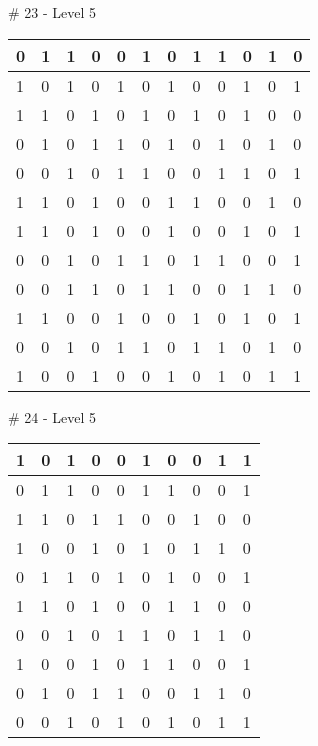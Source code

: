 \smallskip

\# 23 - Level 5 \newline
\begin{tabular}{|m{\collen}|m{\collen}|m{\collen}|m{\collen}|m{\collen}|m{\collen}|m{\collen}|m{\collen}|m{\collen}|m{\collen}|m{\collen}|m{\collen}|}
\hline
  0 & 1 & 1 & 0 & 0 & 1 & 0 & 1 & 1 & 0 & 1 & 0 \\
\hline
  1 & 0 & 1 & 0 & 1 & 0 & 1 & 0 & 0 & 1 & 0 & 1 \\
\hline
  1 & 1 & 0 & 1 & 0 & 1 & 0 & 1 & 0 & 1 & 0 & 0 \\
\hline
  0 & 1 & 0 & 1 & 1 & 0 & 1 & 0 & 1 & 0 & 1 & 0 \\
\hline
  0 & 0 & 1 & 0 & 1 & 1 & 0 & 0 & 1 & 1 & 0 & 1 \\
\hline
  1 & 1 & 0 & 1 & 0 & 0 & 1 & 1 & 0 & 0 & 1 & 0 \\
\hline
  1 & 1 & 0 & 1 & 0 & 0 & 1 & 0 & 0 & 1 & 0 & 1 \\
\hline
  0 & 0 & 1 & 0 & 1 & 1 & 0 & 1 & 1 & 0 & 0 & 1 \\
\hline
  0 & 0 & 1 & 1 & 0 & 1 & 1 & 0 & 0 & 1 & 1 & 0 \\
\hline
  1 & 1 & 0 & 0 & 1 & 0 & 0 & 1 & 0 & 1 & 0 & 1 \\
\hline
  0 & 0 & 1 & 0 & 1 & 1 & 0 & 1 & 1 & 0 & 1 & 0 \\
\hline
  1 & 0 & 0 & 1 & 0 & 0 & 1 & 0 & 1 & 0 & 1 & 1 \\
\hline
\end{tabular}


\smallskip

\# 24 - Level 5 \newline
\begin{tabular}{|m{\collen}|m{\collen}|m{\collen}|m{\collen}|m{\collen}|m{\collen}|m{\collen}|m{\collen}|m{\collen}|m{\collen}|}
\hline
  1 & 0 & 1 & 0 & 0 & 1 & 0 & 0 & 1 & 1 \\
\hline
  0 & 1 & 1 & 0 & 0 & 1 & 1 & 0 & 0 & 1 \\
\hline
  1 & 1 & 0 & 1 & 1 & 0 & 0 & 1 & 0 & 0 \\
\hline
  1 & 0 & 0 & 1 & 0 & 1 & 0 & 1 & 1 & 0 \\
\hline
  0 & 1 & 1 & 0 & 1 & 0 & 1 & 0 & 0 & 1 \\
\hline
  1 & 1 & 0 & 1 & 0 & 0 & 1 & 1 & 0 & 0 \\
\hline
  0 & 0 & 1 & 0 & 1 & 1 & 0 & 1 & 1 & 0 \\
\hline
  1 & 0 & 0 & 1 & 0 & 1 & 1 & 0 & 0 & 1 \\
\hline
  0 & 1 & 0 & 1 & 1 & 0 & 0 & 1 & 1 & 0 \\
\hline
  0 & 0 & 1 & 0 & 1 & 0 & 1 & 0 & 1 & 1 \\
\hline
\end{tabular}


